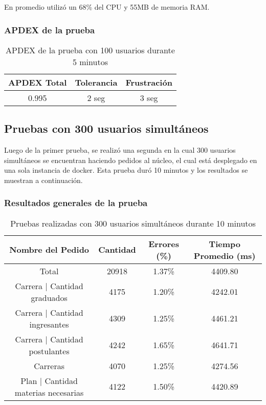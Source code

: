 En promedio utilizó un 68\% del CPU y 55MB de memoria RAM.


\subsubsection{APDEX de la prueba}
\begin{table}[!htbp]
    \centering
    \makegapedcells
    \begin{tabular}{|c|c|c|}
    \hline
    APDEX Total & Tolerancia & Frustración\\ \hline
    0.995 & 2 seg & 3 seg \\ \hline
    \end{tabular}
    \caption{APDEX de la prueba con 100 usuarios durante 5 minutos}
    \label{tab:tabla_planes}
\end{table}

\break

\subsection{Pruebas con 300 usuarios simultáneos}
Luego de la primer prueba, se realizó una segunda en la cual 300 usuarios simultáneos se encuentran haciendo pedidos al núcleo, el cual está desplegado en una sola instancia de docker.
Esta prueba duró 10 minutos y los resultados se muestran a continuación.

\subsubsection{Resultados generales de la prueba}
\begin{table}[!htbp]
    \centering
    \makegapedcells
    \begin{tabular}{|c|c|c|c|}
    \hline
    Nombre del Pedido & Cantidad & Errores (\%) & Tiempo Promedio (ms) \\ \hline
    Total & 20918 & 1.37\% & 4409.80\\ \hline
    Carrera | Cantidad graduados & 4175 & 1.20\% & 4242.01\\ \hline
    Carrera | Cantidad ingresantes & 4309 & 1.25\% & 4461.21\\ \hline
    Carrera | Cantidad postulantes & 4242 & 1.65\% & 4641.71\\ \hline
    Carreras & 4070 & 1.25\% & 4274.56\\ \hline
    Plan | Cantidad materias necesarias & 4122 & 1.50\% & 4420.89\\ \hline
    \end{tabular}
    \caption{Pruebas realizadas con 300 usuarios simultáneos durante 10 minutos}
    \label{tab:tabla_planes}
\end{table}



